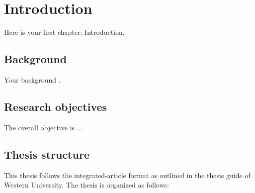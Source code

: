 \chapter{Introduction}
\label{chap: intro}

\begin{refsection}

Here is your first chapter: Introduction.

\section{Background}
Your background \autocite{deng2017volumetric}.

\section{Research objectives}
The overall objective is ...


\section{Thesis structure}
This thesis follows the integrated-article format as outlined in the thesis guide of Western University. The thesis is organized as follows:

\pagebreak
{}
{}

\begin{singlespace}
    \printbibliography[heading=subbibliography]
\end{singlespace}
\end{refsection}
